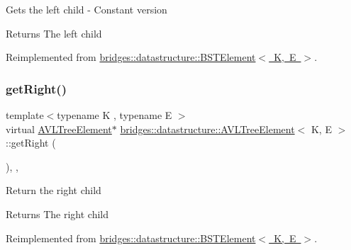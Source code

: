 Gets the left child -\/ Constant version

\begin{DoxyReturn}{Returns}
The left child 
\end{DoxyReturn}


Reimplemented from \mbox{\hyperlink{classbridges_1_1datastructure_1_1_b_s_t_element_abac324ef0b480420bd82ecfe4501d60d}{bridges\+::datastructure\+::\+B\+S\+T\+Element$<$ K, E $>$}}.

\mbox{\label{classbridges_1_1datastructure_1_1_a_v_l_tree_element_aed585fdf56fcbfebac6cd0262c9c1807}} 
\subsubsection{\texorpdfstring{getRight()}{getRight()}\hspace{0.1cm}{\footnotesize\ttfamily [1/2]}}
{\footnotesize\ttfamily template$<$typename K , typename E $>$ \\
virtual \mbox{\hyperlink{classbridges_1_1datastructure_1_1_a_v_l_tree_element}{A\+V\+L\+Tree\+Element}}$\ast$ \mbox{\hyperlink{classbridges_1_1datastructure_1_1_a_v_l_tree_element}{bridges\+::datastructure\+::\+A\+V\+L\+Tree\+Element}}$<$ K, E $>$\+::get\+Right (\begin{DoxyParamCaption}{ }\end{DoxyParamCaption})\hspace{0.3cm}{\ttfamily [inline]}, {\ttfamily [override]}, {\ttfamily [virtual]}}

Return the right child \begin{DoxyReturn}{Returns}
The right child 
\end{DoxyReturn}


Reimplemented from \mbox{\hyperlink{classbridges_1_1datastructure_1_1_b_s_t_element_a80f5085d6d03805dd3091b7693d8e235}{bridges\+::datastructure\+::\+B\+S\+T\+Element$<$ K, E $>$}}.

\mbox{\label{classbridges_1_1datastructure_1_1_a_v_l_tree_element_a5a2c4b96b51da1daa3c0426882250acb}} 
